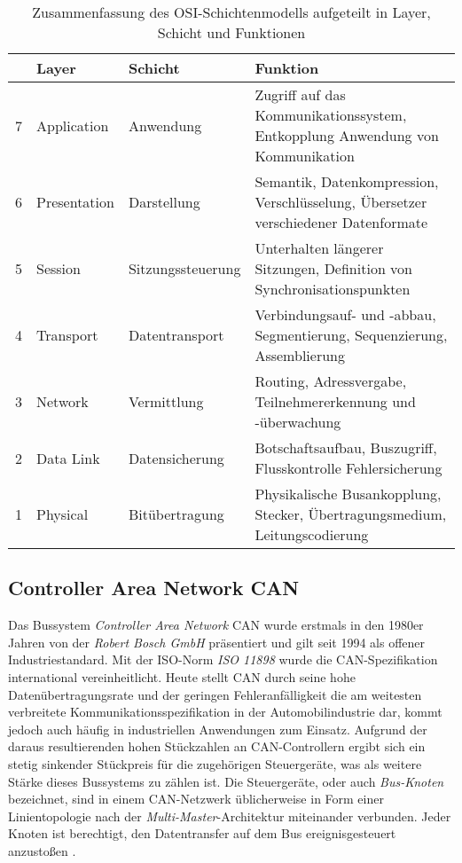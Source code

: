 \begin{table}[!htbp]
	\centering
	\caption{Zusammenfassung des OSI-Schichtenmodells aufgeteilt in Layer,
		Schicht und Funktionen \cite{InternationalOrganizationforStandardization.15.11.1994}}
	\renewcommand{\arraystretch}{1.3}
	\begin{tabular}{l l l p{7.5cm}}
														  	   \toprule
		  &  Layer        & Schicht           & Funktion	\\ \midrule
		7 & Application  & Anwendung         & Zugriff auf das Kommunikationssystem, Entkopplung Anwendung von Kommunikation    		\\
		\rowcolor[gray]{.9} 6 & Presentation & Darstellung       & Semantik, Datenkompression, Verschlüsselung,
		Übersetzer verschiedener Datenformate 			\\
		\rowcolor[gray]{.9} 5 & Session      & Sitzungssteuerung & Unterhalten längerer Sitzungen, Definition von
		Synchronisationspunkten            				\\
		4 & Transport    & Datentransport    & Verbindungsauf- und -abbau, Segmentierung,
		Sequenzierung, Assemblierung            		\\
		\rowcolor[gray]{.9} 3 & Network      & Vermittlung       & Routing, Adressvergabe, Teilnehmererkennung
		und -überwachung                       			\\
		2 & Data Link    & Datensicherung    & Botschaftsaufbau, Buszugriff, Flusskontrolle
		Fehlersicherung                       			\\
		1 & Physical     & Bitübertragung    & Physikalische Busankopplung, Stecker,
		Übertragungsmedium, Leitungscodierung        	\\ \bottomrule
	\end{tabular}
	
	\label{tab:OSI-Schichtenmodell}
\end{table}


\subsection{Controller Area Network CAN} \label{subsec:CAN}
Das Bussystem \emph{Controller Area Network} \acs{CAN} wurde erstmals in den 1980er Jahren von der \emph{Robert Bosch GmbH} präsentiert und gilt seit 1994 als offener Industriestandard. Mit der \acs{ISO}-Norm \emph{ISO 11898} wurde die \acs{CAN}-Spezifikation international vereinheitlicht. Heute stellt \acs{CAN} durch seine hohe Datenübertragungsrate und der geringen Fehleranfälligkeit die am weitesten verbreitete Kommunikationsspezifikation in der Automobilindustrie dar, kommt jedoch auch häufig in industriellen Anwendungen zum Einsatz. Aufgrund der daraus resultierenden hohen Stückzahlen an \acs{CAN}-Controllern ergibt sich ein stetig sinkender Stückpreis für die zugehörigen Steuergeräte, was als weitere Stärke dieses Bussystems zu zählen ist. 
Die Steuergeräte, oder auch \emph{Bus-Knoten} bezeichnet, sind in einem \acs{CAN}-Netzwerk üblicherweise in Form einer Linientopologie nach der \emph{Multi-Master}-Architektur miteinander verbunden. Jeder Knoten ist berechtigt, den Datentransfer auf dem Bus ereignisgesteuert anzustoßen \cite{Wallentowitz.2011, Zimmermann.2014}.

